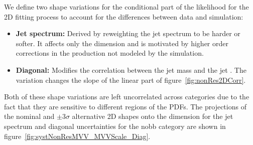 We define two shape variations for the conditional part of the likelihood for the 2D fitting process to account for the differences between data and simulation:
\begin{itemize}
  \item {\bfseries Jet \pt spectrum:} Derived by reweighting the jet \pt spectrum to be harder or softer.
  It affects only the \MVV dimension and is motivated by higher order corrections in the \Wjets production not modeled by the simulation.
  \item {\bfseries Diagonal:} Modifies the correlation between the jet mass and the jet \pt.
  The variation changes the slope of the linear part of figure~\ref{fig:nonRes2DCorr}.
\end{itemize}
Both of these shape variations are left uncorrelated across categories due to the fact that they are sensitive to different regions of the PDFs.
The projections of the nominal and $\pm3\sigma$ alternative 2D shapes onto the \MVV dimension for the jet \pt spectrum and diagonal uncertainties for the nobb category are shown in figure~\ref{fig:systNonResMVV_MVVScale_Diag}.

